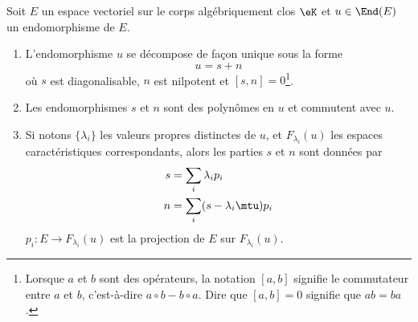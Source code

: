 \begin{theorem} \label{ThoRURcpW}
	Soit \( E\) un espace vectoriel sur le corps algébriquement clos \( \eK\) et \( u\in\End(E)\) un endomorphisme de \( E\).

	\begin{enumerate}
		\item

		      L'endomorphisme \( u\) se décompose de façon unique sous la forme
		      \begin{equation}
			      u=s+n
		      \end{equation}
		      où \( s\) est diagonalisable, \( n\) est nilpotent et \( [s,n]=0\)\footnote{Lorsque \( a\) et \( b\) sont des opérateurs, la notation \( [a,b]\) signifie le commutateur entre \( a\) et \( b\), c'est-à-dire \( a\circ b-b\circ a\). Dire que \( [a,b]=0\) signifie que \( ab=ba\).}.
		\item
		      Les endomorphismes \( s\) et \( n\) sont des polynômes en \( u\) et commutent avec \( u\).
		\item   \label{ItemThoRURcpWiii}
		      Si notons \( \{ \lambda_i \}\) les valeurs propres distinctes de \( u\), et \( F_{\lambda_i}(u)\) les espaces caractéristiques correspondants, alors les parties \( s\) et \( n\) sont données par
		      \begin{subequations}
			      \begin{align}
				      s & =\sum_i\lambda_ip_i         \\
				      n & =\sum_i(s-\lambda_i\mtu)p_i
			      \end{align}
		      \end{subequations}
		      \( p_i\colon E\to F_{\lambda_i}(u)\) est la projection de \( E\) sur \( F_{\lambda_i}(u)\).
	\end{enumerate}
\end{theorem}

